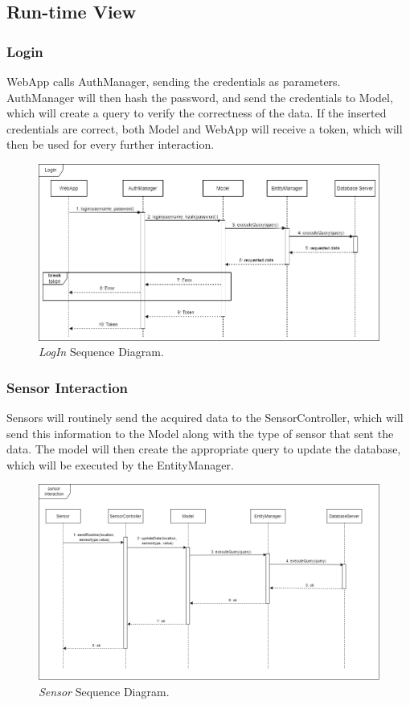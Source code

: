 \subsection{Run-time View}
\subsubsection{Login}
WebApp calls AuthManager, sending the credentials as parameters. AuthManager will then hash the password, and send the credentials to Model, which will create a query to verify the correctness of the data. If the inserted credentials are correct, both Model and WebApp will receive a token, which will then be used for every further interaction.
\begin{figure}[H]
    \centering
    \includegraphics[width=\textwidth]{Images/Sequence Diagram/Login.png}
    \caption{\textit{LogIn} Sequence Diagram.}
\end{figure}
\newpage
\subsubsection{Sensor Interaction}
Sensors will routinely send the acquired data to the SensorController, which will send this information to the Model along with the type of sensor that sent the data. The model will then create the appropriate query to update the database, which will be executed by the EntityManager.
\begin{figure}[H]
    \centering
    \includegraphics[width=\textwidth]{Images/Sequence Diagram/Sensor.png}
    \caption{\textit{Sensor} Sequence Diagram.}
\end{figure}
\newpage
